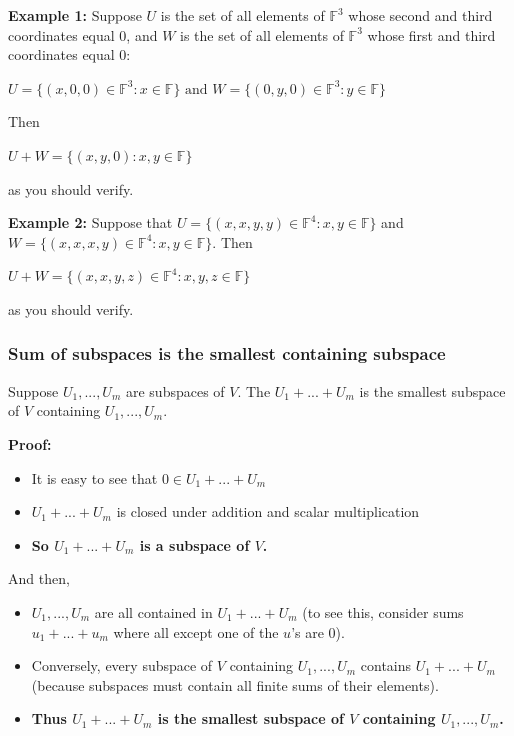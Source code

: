 \documentclass{report}
\begin{document}
\textbf{Example 1:}\newline
Suppose $U$ is the set of all elements of $\mathbb{F}^3$ whose second and third coordinates equal $0$, and $W$ is the set of all elements of $\mathbb{F}^3$ whose first and third coordinates equal $0$:\newline
\centerline{$U=\{(x,0,0) \in \mathbb{F}^3 : x \in \mathbb{F} \} \text{ and } W=\{(0,y,0) \in \mathbb{F}^3 : y \in \mathbb{F}\}$}\newline
Then\newline
\centerline{$U+W=\{(x,y,0):x,y \in \mathbb{F}\}$}\newline
as you should verify.

\textbf{Example 2:}\newline
Suppose that $U = \{(x,x,y,y) \in \mathbb{F}^4 : x,y \in \mathbb{F} \}$ and $W=\{(x,x,x,y) \in \mathbb{F}^4 : x,y \in \mathbb{F} \}$. Then\newline
\centerline{$U+W= \{ (x,x,y,z) \in \mathbb{F}^4 : x,y,z \in \mathbb{F} \}$}\newline
as you should verify.

\subsubsection{Sum of subspaces is the smallest containing subspace}
Suppose $U_1, ..., U_m$ are subspaces of $V$. The $U_1 + ... + U_m$ is the smallest subspace of $V$ containing $U_1,...,U_m$.\newline

\textbf{Proof:}\newline

\begin{itemize}
    \item It is easy to see that $0 \in U_1 + ... + U_m$
    \item $U_1 + ... + U_m$ is closed under addition and scalar multiplication
    \item \textbf{So $U_1 + ... + U_m$ is a subspace of $V$.}
\end{itemize}

And then,
\begin{itemize}
    \item $U_1, ..., U_m$ are all contained in $U_1 + ... + U_m$ (to see this, consider sums $u_1 + ... + u_m$ where all except one of the $u$'s are $0$).
    \item Conversely, every subspace of $V$ containing $U_1,...,U_m$ contains $U_1+...+U_m$ (because subspaces must contain all finite sums of their elements).
    \item \textbf{Thus $U_1 + ... + U_m$ is the smallest subspace of $V$ containing $U_1,...,U_m$.} 
\end{itemize}
\end{document}
